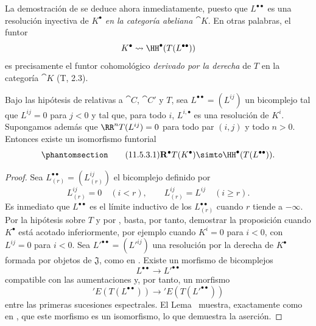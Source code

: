 \documentclass[oneside]{amsart}
\renewcommand{\geq}{\geqslant}
\let\EGAOriginalLabel\label
\renewcommand{\label}[1]{\phantomsection\EGAOriginalLabel{#1}}
\begin{document}
\begin{env}[11.5.2.5]
\label{0.11.5.2.5}
La demostración de  se deduce ahora inmediatamente, puesto que $L^{\bullet\bullet}$ es una resolución inyectiva de $K^\bullet$ \emph{en la categoría abeliana $\cat{K}$}.
En otras palabras, el funtor
\[
  K^\bullet\leadsto\HH^\bullet(T(L^{\bullet\bullet}))
\]
es precisamente el funtor cohomológico \emph{derivado por la derecha} de $T$ en la categoría $\cat{K}$ (T, 2.3).
\end{env}

\begin{proposition}[11.5.3]
\label{0.11.5.3}
Bajo las hipótesis de \textup{} relativas a $\cat{C}$, $\cat{C}'$ y $T$, sea $L^{\bullet\bullet}=(L^{ij})$ un bicomplejo tal que $L^{ij}=0$ para $j<0$ y tal que, para todo $i$, $L^{i,\bullet}$ es una resolución de $K^i$.
Supongamos además que $\RR^nT(L^{ij})=0$ para todo par $(i,j)$ y todo $n>0$.
Entonces existe un isomorfismo funtorial
\[
\label{0.11.5.3.1}
\tag{11.5.3.1}
  \mathbf{R}^\bullet T(K^\bullet)
  \simto
  \HH^\bullet(T(L^{\bullet\bullet})).
\]
\end{proposition}

\begin{proof}
Sea $L^{\bullet\bullet}_{(r)}=(L^{ij}_{(r)})$ el bicomplejo definido por
\[
  L^{ij}_{(r)}=0\quad(i<r),\qquad
  L^{ij}_{(r)}=L^{ij}\quad(i\geq r).
\]
Es inmediato que $L^{\bullet\bullet}$ es el límite inductivo de los $L^{\bullet\bullet}_{(r)}$ cuando $r$ tiende a $-\infty$.
Por la hipótesis sobre $T$ y por , basta, por tanto, demostrar la proposición cuando $K^\bullet$ está acotado inferiormente, por ejemplo cuando $K^i=0$ para $i<0$, con $L^{ij}=0$ para $i<0$.
Sea $L'^{\bullet\bullet}=(L'^{ij})$ una resolución por la derecha de $K^\bullet$ formada por objetos de $\mathfrak{J}$, como en .
Existe un morfismo de bicomplejos
\[
  L^{\bullet\bullet}\longrightarrow L'^{\bullet\bullet}
\]
compatible con las aumentaciones y, por tanto, un morfismo
\[
  'E(T(L^{\bullet\bullet}))\longrightarrow{}'E(T(L'^{\bullet\bullet}))
\]
entre las primeras sucesiones espectrales.
El Lema~ muestra, exactamente como en , que este morfismo es un isomorfismo, lo que demuestra la aserción.
\end{proof}
\end{document}
